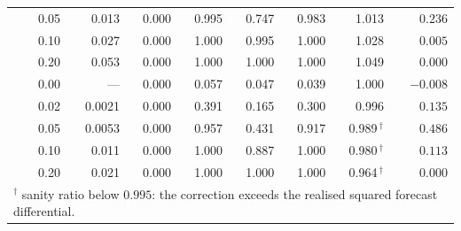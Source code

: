 \begin{table}[htbp]
\begin{tabular}{lrrrrrrrr}
 & 0.05 & 0.013 & 0.000 & 0.995 & 0.747 & 0.983 & 1.013 & $0.236$ \\
 & 0.10 & 0.027 & 0.000 & 1.000 & 0.995 & 1.000 & 1.028 & $0.005$ \\
 & 0.20 & 0.053 & 0.000 & 1.000 & 1.000 & 1.000 & 1.049 & $0.000$ \\
\addlinespace
1.00 & 0.00 & --- & 0.000 & 0.057 & 0.047 & 0.039 & 1.000 & $-0.008$ \\
 & 0.02 & 0.0021 & 0.000 & 0.391 & 0.165 & 0.300 & 0.996 & $0.135$ \\
 & 0.05 & 0.0053 & 0.000 & 0.957 & 0.431 & 0.917 & 0.989\,$^\dagger$ & $0.486$ \\
 & 0.10 & 0.011 & 0.000 & 1.000 & 0.887 & 1.000 & 0.980\,$^\dagger$ & $0.113$ \\
 & 0.20 & 0.021 & 0.000 & 1.000 & 1.000 & 1.000 & 0.964\,$^\dagger$ & $0.000$ \\
\bottomrule
\multicolumn{9}{l}{\footnotesize $^\dagger$ sanity ratio below $0.995$: the correction exceeds the realised squared forecast differential.}
\end{tabular}
\end{table}
